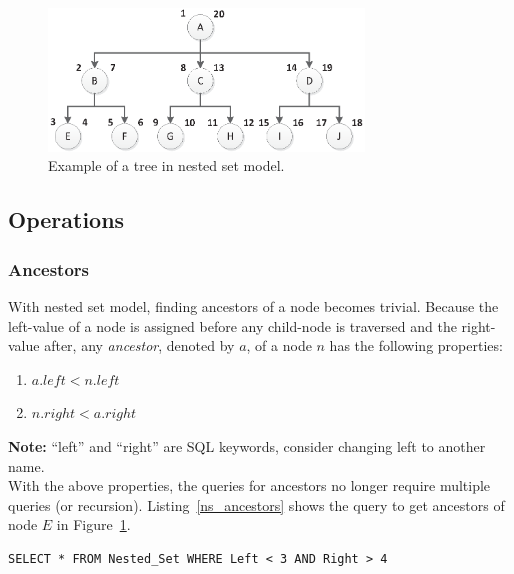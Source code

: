 \begin{figure}[H]
\begin{center}
\includegraphics[width=3.3in]{images/tree-lr.eps}
\caption{Example of a tree in nested set model.\label{fig:tree-lr}}
\end{center}
\end{figure}

\subsection{Operations}

\subsubsection{Ancestors}

With nested set model, finding ancestors of a node becomes trivial. Because the left-value of a node is assigned before any child-node is traversed and the right-value after, any \emph{ancestor}, denoted by $a$, of a node $n$ has the following properties:

\begin{enumerate}
\item $a.left < n.left$
\item $n.right < a.right$
\end{enumerate}

\textbf{Note:} ``left'' and ``right'' are SQL keywords, consider changing left to another name.\\

With the above properties, the queries for ancestors no longer require multiple queries (or recursion). Listing~\ref{ns_ancestors} shows the query to get ancestors of node $E$ in Figure~\ref{fig:tree-lr}.

\begin{minipage}{\linewidth}
\begin{lstlisting}[frame=single]
SELECT * FROM Nested_Set WHERE Left < 3 AND Right > 4
\end{lstlisting}	
\end{minipage}

